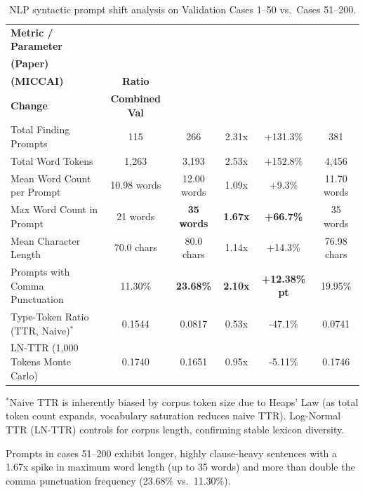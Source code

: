 \documentclass[11pt,a4paper]{article}
\begin{document}
\begin{table}[htbp]
\centering
\caption{NLP syntactic prompt shift analysis on Validation Cases 1--50 vs.\ Cases 51--200.}
\label{tab:nlp_shift}
\footnotesize
\setlength{\tabcolsep}{4.5pt}
\begin{tabularx}{\linewidth}{>{\raggedright\arraybackslash}Xccccc}
\toprule
\textbf{Metric / Parameter} & \makecell{\textbf{Cases 1--50}\\\textbf{(Paper)}} & \makecell{\textbf{Cases 51--200}\\\textbf{(MICCAI)}} & \textbf{Ratio} & \makecell{\textbf{Percentage}\\\textbf{Change}} & \textbf{Combined Val} \\
\midrule
Total Finding Prompts & 115 & 266 & 2.31x & +131.3\% & 381 \\
Total Word Tokens & 1,263 & 3,193 & 2.53x & +152.8\% & 4,456 \\
Mean Word Count per Prompt & 10.98 words & 12.00 words & 1.09x & +9.3\% & 11.70 words \\
Max Word Count in Prompt & 21 words & \textbf{35 words} & \textbf{1.67x} & \textbf{+66.7\%} & 35 words \\
Mean Character Length & 70.0 chars & 80.0 chars & 1.14x & +14.3\% & 76.98 chars \\
Prompts with Comma Punctuation & 11.30\% & \textbf{23.68\%} & \textbf{2.10x} & \textbf{+12.38\% pt} & 19.95\% \\
Type-Token Ratio (TTR, Naive)$^*$ & 0.1544 & 0.0817 & 0.53x & -47.1\% & 0.0741 \\
LN-TTR (1,000 Tokens Monte Carlo) & 0.1740 & 0.1651 & 0.95x & -5.11\% & 0.1746 \\
\bottomrule
\end{tabularx}

\vspace{2mm}
\raggedright \footnotesize $^*$Naive TTR is inherently biased by corpus token size due to Heaps' Law (as total token count expands, vocabulary saturation reduces naive TTR). Log-Normal TTR (LN-TTR) controls for corpus length, confirming stable lexicon diversity.
\end{table}

Prompts in cases 51--200 exhibit longer, highly clause-heavy sentences with a 1.67x spike in maximum word length (up to 35 words) and more than double the comma punctuation frequency (23.68\% vs.\ 11.30\%).
\end{document}
